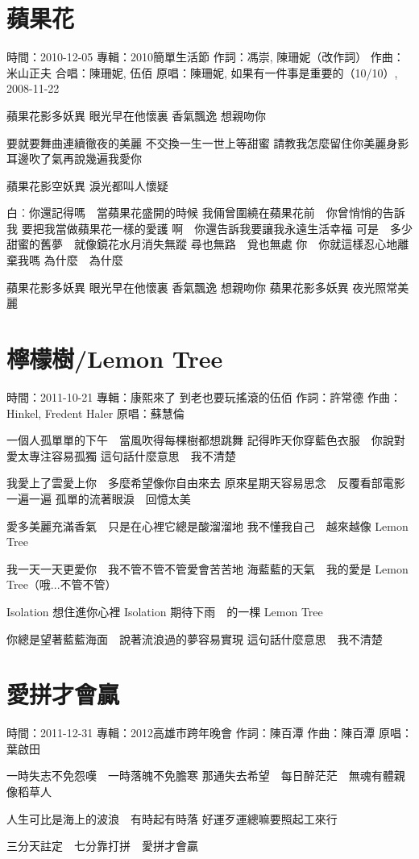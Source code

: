 \documentclass[UTF8,a4paper,oneside,twocolumn,12pt]{ctexbook}
\newcommand{\infopair}[2]{\textbullet #1：#2}
\newcommand{\zc}[1][伍佰]{\infopair{作詞}{#1}}
\newcommand{\zq}[1][伍佰]{\infopair{作曲}{#1}}
\newcommand{\zj}[1]{\infopair{專輯}{#1}}
\newcommand{\yc}[1]{\infopair{原唱}{#1}}
\newcommand{\sj}[1]{\infopair{時間}{#1}}
\newenvironment{info}{\begin{flushleft}\kaishu
	}
	{\end{flushleft}\normalsize\yahei\par}
\newenvironment{lyric}{
	}
{}
\begin{document}
\section{蘋果花}
\begin{info}
	\sj{2010-12-05}
	\zj{2010簡單生活節}
	\zc[馮崇, 陳珊妮（改作詞）]
	\zq[米山正夫]
	\infopair{合唱}{陳珊妮, 伍佰}
	\yc{陳珊妮, 如果有一件事是重要的（10/10）, 2008-11-22}
\end{info}
\begin{lyric}
	蘋果花影多妖異 眼光早在他懷裏
	香氣飄逸 想親吻你

	要就要舞曲連續徹夜的美麗
	不交換一生一世上等甜蜜
	請教我怎麼留住你美麗身影
	耳邊吹了氣再說幾遍我愛你

	蘋果花影空妖異 淚光都叫人懷疑

	白︰你還記得嗎　當蘋果花盛開的時候
	我倆曾圍繞在蘋果花前　你曾悄悄的告訴我
	要把我當做蘋果花一樣的愛護
	啊　你還告訴我要讓我永遠生活幸福
	可是　多少甜蜜的舊夢　就像鏡花水月消失無蹤
	尋也無路　覓也無處
	你　你就這樣忍心地離棄我嗎
	為什麼　為什麼

	蘋果花影多妖異 眼光早在他懷裏
	香氣飄逸 想親吻你
	蘋果花影多妖異 夜光照常美麗
\end{lyric}

\section{檸檬樹/Lemon Tree}
\begin{info}
	\sj{2011-10-21}
	\zj{康熙來了 到老也要玩搖滾的伍佰}
	\zc[許常德]
	\zq[Hinkel, Fredent Haler]
	\yc{蘇慧倫}
\end{info}
\begin{lyric}
	一個人孤單單的下午　當風吹得每棵樹都想跳舞
	記得昨天你穿藍色衣服　你說對愛太專注容易孤獨
	這句話什麼意思　我不清楚

	我愛上了雲愛上你　多麼希望像你自由來去
	原來星期天容易思念　反覆看部電影一遍一遍
	孤單的流著眼淚　回憶太美

	愛多美麗充滿香氣　只是在心裡它總是酸溜溜地
	我不懂我自己　越來越像 Lemon Tree

	我一天一天更愛你　我不管不管不管愛會苦苦地
	海藍藍的天氣　我的愛是 Lemon Tree（哦...不管不管）

	Isolation 想住進你心裡
	Isolation 期待下雨　的一棵 Lemon Tree

	你總是望著藍藍海面　說著流浪過的夢容易實現
	這句話什麼意思　我不清楚
\end{lyric}

\section{愛拼才會贏}
\begin{info}
	\sj{2011-12-31}
	\zj{2012高雄市跨年晚會}
	\zc[陳百潭]
	\zq[陳百潭]
	\yc{葉啟田}
\end{info}
\begin{lyric}
	一時失志不免怨嘆　一時落魄不免膽寒
	那通失去希望　每日醉茫茫　無魂有體親像稻草人

	人生可比是海上的波浪　有時起有時落
	好運歹運總嘛要照起工來行

	三分天註定　七分靠打拼　愛拼才會贏
\end{lyric}
\end{document}
